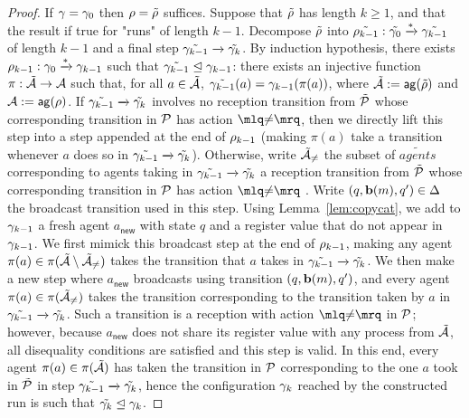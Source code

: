 \begin{proof}
If $\gamma = \gamma_0$ then $\rho = \tilde{\rho}$ suffices. Suppose that $\tilde{\rho}$ has length $k \geq 1$, and that the result if true for "runs" of length $k-1$. Decompose $\tilde{\rho}$ into $\tilde{\rho_{k-1}}: \tilde{\gamma_0} \xrightarrow{*} \tilde{\gamma_{k-1}}$ of length $k-1$ and a final step $\tilde{\gamma_{k-1}} \xrightarrow{} \tilde{\gamma_k}$. 
By induction hypothesis, there exists $\rho_{k-1}: \gamma_0 \xrightarrow{*} \gamma_{k-1}$ such that $\tilde{\gamma_{k-1}} \trianglelefteq \gamma_{k-1}$: there exists an injective function $\pi : \tilde{\mathcal{A}} \rightarrow \mathcal{A}$
 such that, for all $a \in \tilde{\mathcal{A}}$, $\tilde{\gamma_{k-1}}(a) = \gamma_{k-1}(\pi(a))$, where $\tilde{\mathcal{A}} := \mathsf{ag}(\tilde{\rho})$ and $\mathcal{A} := \mathsf{ag}(\rho)$. If $\tilde{\gamma_{k-1}} \xrightarrow{} \tilde{\gamma_k}$ involves no reception transition from $\tilde{\mathcal{P}}$ whose corresponding transition in $\mathcal{P}$ has action $\quotemarks{\diseqtestact}$, then we directly lift this step into a step appended at the end of $\rho_{k-1}$ (making $\pi(a)$ take a transition whenever $a$ does so in $\tilde{\gamma_{k-1}} \xrightarrow{} \tilde{\gamma_k}$). Otherwise, write $\tilde{\mathcal{A}}_{{\ne}}$ the subset of $\tilde{agents}$ corresponding to agents taking in $\tilde{\gamma_{k-1}} \xrightarrow{} \tilde{\gamma_k}$ a reception transition from $\tilde{\mathcal{P}}$ whose corresponding transition in $\mathcal{P}$ has action $\quotemarks{\diseqtestact}$ . Write $(q, \textbf{b}(m), q') \in \Delta$ the broadcast transition used in this step.  Using Lemma~\ref{lem:copycat}, we add to $\gamma_{k-1}$ a fresh agent $a_{\mathsf{new}}$ with state $q$ and a register value that do not appear in $\gamma_{k-1}$. 
We first mimick this broadcast step at the end of $\rho_{k-1}$, making any agent $\pi(a) \in \pi(\tilde{\mathcal{A}} \setminus \tilde{\mathcal{A}}_{{\ne}})$ takes the transition that $a$ takes in $\tilde{\gamma_{k-1}} \xrightarrow{} \tilde{\gamma_k}$. We then make a new step where $a_{\mathsf{new}}$ broadcasts using transition $(q, \textbf{b}(m), q')$, and every agent $\pi(a) \in \pi(\tilde{\mathcal{A}}_{{\ne}})$ takes the transition corresponding to the transition taken by $a$ in $\tilde{\gamma_{k-1}} \xrightarrow{} \tilde{\gamma_k}$. Such a transition is a reception with action $\quotemarks{\diseqtestact}$ in $\mathcal{P}$; however, because $a_{\mathsf{new}}$ does not share its register value with any process from $\tilde{\mathcal{A}}$, all disequality conditions are satisfied and this step is valid. In this end, every agent $\pi(a) \in \pi(\tilde{\mathcal{A}})$ has taken the transition in $\mathcal{P}$ corresponding to the one $a$ took in $\tilde{\mathcal{P}}$ in step $\tilde{\gamma_{k-1}} \xrightarrow{} \tilde{\gamma_k}$, hence the configuration $\gamma_k$ reached by the constructed run is such that $\tilde{\gamma_k} \trianglelefteq \gamma_k$. 
\end{proof}

